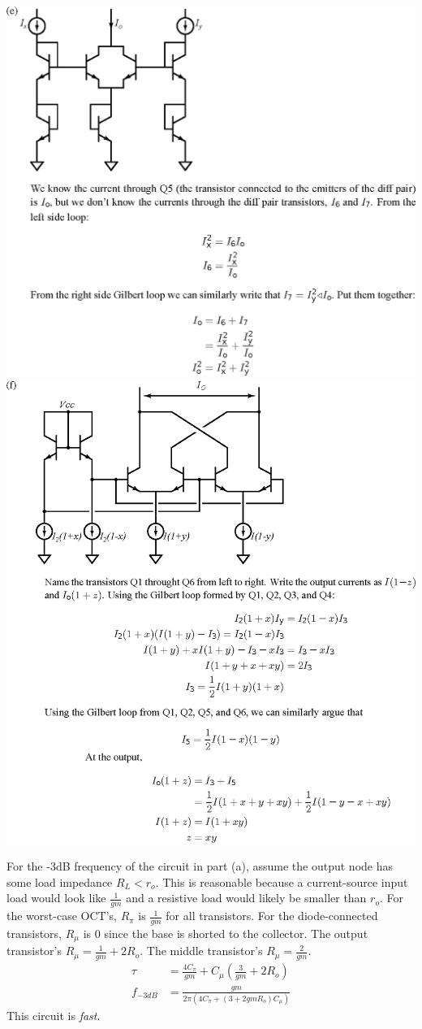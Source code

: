 \documentclass[11pt,twoside]{article}
\begin{document}
\clearpage
\begin{center}
\includegraphics[width=.9\textwidth]{trans2-soln}
\includegraphics[width=.9\textwidth]{trans3-soln}
\end{center}
\clearpage
For the -3dB frequency of the circuit in part (a), assume the output node has some load impedance $R_L < r_o$.
This is reasonable because a current-source input load would look like $\frac{1}{gm}$ and a resistive load would likely be smaller than $r_o$.
For the worst-case OCT's, $R_\pi$ is $\frac{1}{gm}$ for all transistors.
For the diode-connected transistors, $R_\mu$ is 0 since the base is shorted to the collector.
The output transistor's $R_\mu = \frac{1}{gm}+{2R_o}$.
The middle transistor's $R_\mu = \frac{2}{gm}$.
\begin{align}
	\tau &= \frac{4C_\pi}{gm}+C_\mu(\frac{3}{gm}+2R_o) \\
	f_{-3dB} &= \frac{gm}{2\pi(4C_\pi+(3+2gmR_o)C_\mu)}
\end{align}
This circuit is {\it fast}.
\clearpage
\end{document}
